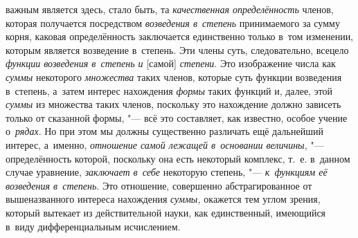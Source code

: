 важным является здесь, стало быть, та {\em качественная определённость} членов,
которая получается посредством {\em возведения в~степень} принимаемого за сумму
корня, каковая определённость заключается единственно только в~том изменении,
которым является возведение в~степень. Эти члены суть, следовательно, всецело
{\em функции возведения в~степень и} [самой] {\em степени}. Это изображение
числа как {\em суммы} некоторого {\em множества} таких членов, которые суть
функции возведения в~степень, а~затем интерес нахождения {\em формы} таких
функций и, далее, этой {\em суммы} из множества таких членов, поскольку это
нахождение должно зависеть только от сказанной формы, "--- всё это составляет,
как известно, особое учение о~{\em рядах}. Но при этом мы должны существенно
различать ещё дальнейший интерес, а~именно, {\em отношение самой лежащей
в~основании величины,} "--- определённость которой, поскольку она есть
некоторый комплекс, т.~е. в~данном случае уравнение, {\em заключает в~себе}
некоторую степень, "--- {\em к~функциям её возведения в~степень}. Это
отношение, совершенно абстрагированное от вышеназванного интереса нахождения
{\em суммы,} окажется тем углом зрения, который вытекает из действительной
науки, как единственный, имеющийся в~виду дифференциальным исчислением.

